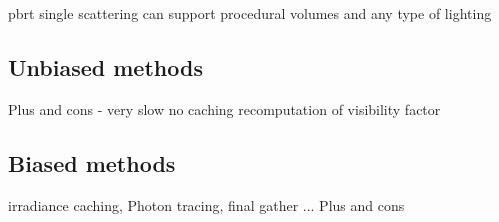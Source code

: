 pbrt single scattering
can support procedural volumes and any type of lighting
\subsection{Unbiased methods}
Plus and cons - very slow no caching recomputation of visibility factor
\subsection{Biased methods}
\cite{jarosz08thesis} %
irradiance caching, Photon tracing, final gather ...
Plus and cons

